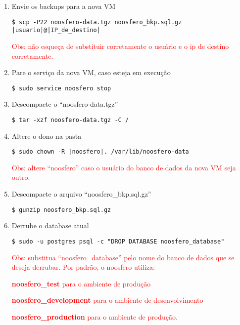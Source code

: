 \begin{enumerate}
\item Envie os backups para a nova VM
\begin{lstlisting}[style=base]
$ scp -P22 noosfero-data.tgz noosfero_bkp.sql.gz |usuario|@|IP_de_destino|
\end{lstlisting}

\textcolor{red}{{\scriptsize Obs: não esqueça de substituir corretamente o usuário e o ip de destino corretamente.}}

\item Pare o serviço da nova VM, caso esteja em execução
\begin{lstlisting}
$ sudo service noosfero stop
\end{lstlisting}

\item Descompacte o “noosfero-data.tgz”
\begin{lstlisting}
$ tar -xzf noosfero-data.tgz -C /
\end{lstlisting}

\item Altere o dono na pasta
\begin{lstlisting}[style=base]
$ sudo chown -R |noosfero|. /var/lib/noosfero-data
\end{lstlisting}

\textcolor{red}{{\scriptsize Obs: altere “noosfero” caso o usuário do banco de dados da nova VM seja outro. }}

\item Descompacte o arquivo “noosfero\_bkp.sql.gz”
\begin{lstlisting}
$ gunzip noosfero_bkp.sql.gz
\end{lstlisting}

\item Derrube o database atual
\begin{lstlisting}
$ sudo -u postgres psql -c "DROP DATABASE noosfero_database"
\end{lstlisting}

\textcolor{red}{{\scriptsize  Obs: substitua  “noosfero\_database” pelo nome do banco de dados que se deseja derrubar. Por padrão, o noosfero utiliza: }}

\textcolor{red}{{\scriptsize	\textbf{noosfero\_test} para o ambiente de produção}}

\textcolor{red}{{\scriptsize	\textbf{noosfero\_development} para o ambiente de desenvolvimento}}

\textcolor{red}{{\scriptsize 	\textbf{noosfero\_production} para o ambiente de produção. }}


\end{enumerate}
